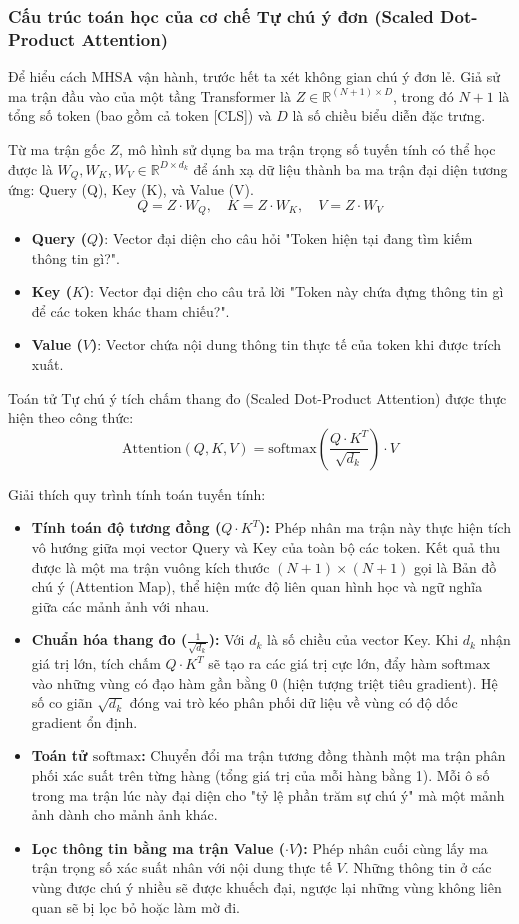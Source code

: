 \subsubsection{Cấu trúc toán học của cơ chế Tự chú ý đơn (Scaled Dot-Product Attention)}
Để hiểu cách MHSA vận hành, trước hết ta xét không gian chú ý đơn lẻ. Giả sử ma trận đầu vào của một tầng Transformer là $Z \in \mathbb{R}^{(N+1) \times D}$, trong đó $N+1$ là tổng số token (bao gồm cả token [CLS]) và $D$ là số chiều biểu diễn đặc trưng.

Từ ma trận gốc $Z$, mô hình sử dụng ba ma trận trọng số tuyến tính có thể học được là $W_Q, W_K, W_V \in \mathbb{R}^{D \times d_k}$ để ánh xạ dữ liệu thành ba ma trận đại diện tương ứng: Query (Q), Key (K), và Value (V).$$Q = Z \cdot W_Q, \quad K = Z \cdot W_K, \quad V = Z \cdot W_V$$

\begin{itemize}
    \item \textbf{Query ($Q$)}: Vector đại diện cho câu hỏi "Token hiện tại đang tìm kiếm thông tin gì?".
    \item \textbf{Key ($K$)}: Vector đại diện cho câu trả lời "Token này chứa đựng thông tin gì để các token khác tham chiếu?".
    \item \textbf{Value ($V$)}: Vector chứa nội dung thông tin thực tế của token khi được trích xuất.
\end{itemize}

Toán tử Tự chú ý tích chấm thang đo (Scaled Dot-Product Attention) được thực hiện theo công thức: $$\text{Attention}(Q, K, V) = \text{softmax}\left(\frac{Q \cdot K^T}{\sqrt{d_k}}\right) \cdot V$$

Giải thích quy trình tính toán tuyến tính:
\begin{itemize}
    \item \textbf{Tính toán độ tương đồng ($Q \cdot K^T$):} Phép nhân ma trận này thực hiện tích vô hướng giữa mọi vector Query và Key của toàn bộ các token. Kết quả thu được là một ma trận vuông kích thước $(N+1) \times (N+1)$ gọi là Bản đồ chú ý (Attention Map), thể hiện mức độ liên quan hình học và ngữ nghĩa giữa các mảnh ảnh với nhau.
    \item \textbf{Chuẩn hóa thang đo ($\frac{1}{\sqrt{d_k}}$):} Với $d_k$ là số chiều của vector Key. Khi $d_k$ nhận giá trị lớn, tích chấm $Q \cdot K^T$ sẽ tạo ra các giá trị cực lớn, đẩy hàm $\text{softmax}$ vào những vùng có đạo hàm gần bằng 0 (hiện tượng triệt tiêu gradient). Hệ số co giãn $\sqrt{d_k}$ đóng vai trò kéo phân phối dữ liệu về vùng có độ dốc gradient ổn định.
    \item \textbf{Toán tử $\text{softmax}$:} Chuyển đổi ma trận tương đồng thành một ma trận phân phối xác suất trên từng hàng (tổng giá trị của mỗi hàng bằng 1). Mỗi ô số trong ma trận lúc này đại diện cho "tỷ lệ phần trăm sự chú ý" mà một mảnh ảnh dành cho mảnh ảnh khác.
    \item \textbf{Lọc thông tin bằng ma trận Value ($\cdot V$):} Phép nhân cuối cùng lấy ma trận trọng số xác suất nhân với nội dung thực tế $V$. Những thông tin ở các vùng được chú ý nhiều sẽ được khuếch đại, ngược lại những vùng không liên quan sẽ bị lọc bỏ hoặc làm mờ đi.
\end{itemize}
